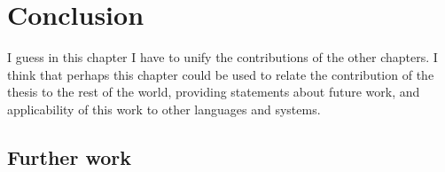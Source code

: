 
\chapter{Conclusion}


I guess in this chapter I have to unify the contributions of the other
chapters.
I think that perhaps this chapter could be used to relate the contribution
of the thesis to the rest of the world, providing statements about future
work, and applicability of this work to other languages and systems.


\section{Further work}
\label{sec:further_work}




